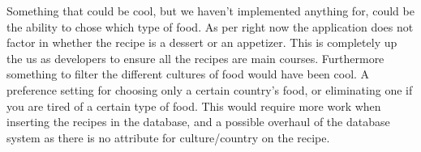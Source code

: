 Something that could be cool, but we haven't implemented anything for, could be the ability to chose which type of food. As per right now the application does not factor in whether the recipe is a dessert or an appetizer. This is completely up the us as developers to ensure all the recipes are main courses. Furthermore something to filter the different cultures of food would have been cool. A preference setting for choosing only a certain country's food, or eliminating one if you are tired of a certain type of food. This would require more work when inserting the recipes in the database, and a possible overhaul of the database system as there is no attribute for culture/country on the recipe.